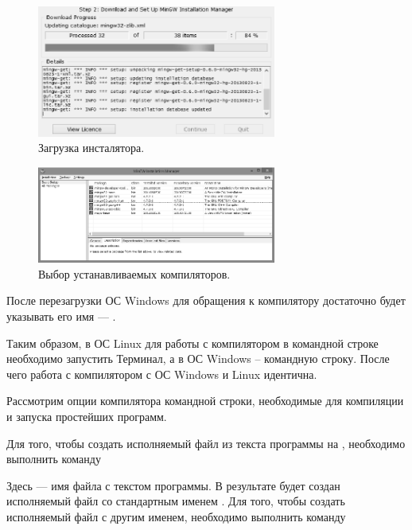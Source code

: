 \begin{figure}[htb]
\begin{center}
\includegraphics[width=0.7\textwidth]{img/ris_app_4}
\caption[Загрузка инсталятора.]{Загрузка инсталятора.}
\label{app:refDrawing3}
\end{center}
\end{figure}


\begin{figure}[htb]
\begin{center}
\includegraphics[width=0.7\textwidth]{img/ris_app_5}
\caption[Выбор устанавливаемых компиляторов.]{Выбор устанавливаемых компиляторов.}
\label{app:refDrawing4}
\end{center}
\end{figure}

После перезагрузки ОС Windows для обращения к компилятору достаточно будет указывать его имя --- .

Таким образом, в ОС Linux для работы с компилятором в командной строке необходимо запустить Терминал, а в ОС Windows –
командную строку. После чего работа с компилятором  с ОС Windows и Linux идентична.

Рассмотрим опции компилятора командной строки, необходимые для компиляции и запуска простейших программ. 

Для того, чтобы создать исполняемый файл из текста программы на , необходимо выполнить команду 


Здесь  --- имя файла с текстом программы. В результате будет создан исполняемый файл со стандартным
именем . Для того, чтобы создать исполняемый файл с другим именем, необходимо выполнить команду 

